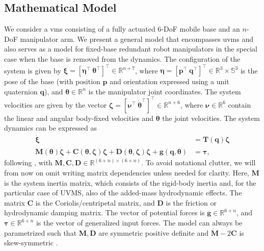 \documentclass[../main.tex]{subfiles}
\begin{document}
\subsection{Mathematical Model}
We consider a \gls{vms} consisting of a fully actuated $6$-DoF mobile base and an $n$-DoF manipulator arm. We present a general model that encompasses \gls{uvms} and also serves as a model for fixed-base redundant robot manipulators in the special case when the base is removed from the dynamics. The configuration of the system is given by $\bm{\xi} = [ \bm{\eta}^{\top} \  \bm{\theta}^{\top}]^{\top} \in \mathbb{R}^{n+7}$, where $\bm{\eta} = [ \bm{p}^{\top} \  \bm{q}^{\top}]^{\top} \in \mathbb{R}^3 \times \mathbb{S}^3$ is the pose of the base (with position $\bm{p}$ and orientation expressed using a unit quaternion $\bm{q}$), and $\bm{\theta} \in \mathbb{R}^n$ is the manipulator joint coordinates. The system velocities are given by the vector $\bm{\zeta} = [ \bm{\nu}^{\top} \  \dot{\bm{\theta}}^{\top}]^{\top} \in \mathbb{R}^{n+6}$, where $\bm{\nu} \in \mathbb{R}^6$ contain the linear and angular body-fixed velocities and $\dot{\bm{\theta}}$ the joint velocities. The system dynamics can be expressed as
\begin{subequations}
\label{eq:UVMS_dynamics}
\begin{align}
    \dot{\bm{\xi}} &= \bm{T}( \bm{q} ) \bm{\zeta} \\
    \bm{M}(\bm{\theta}) \dot{\bm{\zeta}}
    + \bm{C}(\bm{\theta}, \bm{\zeta}) \bm{\zeta}
    + \bm{D}(\bm{\theta}, \bm{\zeta}) \bm{\zeta}
    + \bm{g}(\bm{q},\bm{\theta}) &= \bm{\tau},
\end{align}
\end{subequations}
following \cite{Antonelli2018}, with $\bm{M}, \bm{C}, \bm{D} \in \mathbb{R}^{(6+n) \times (6+n)}$. To avoid notational clutter, we will from now on omit writing matrix dependencies unless needed for clarity. Here, $\bm{M}$ is the system inertia matrix, which consists of the rigid-body inertia and, for the particular case of UVMS, also of the added-mass hydrodynamic effects. The matrix $\bm{C}$ is the Coriolis/centripetal matrix, and $\bm{D}$ is the friction or hydrodynamic damping matrix. The vector of potential forces is $\bm{g} \in \mathbb{R}^{6+n}$, and $\bm{\tau} \in \mathbb{R}^{6+n}$ is the vector of generalized input forces. The model can always be parametrized such that $\bm{M}, \bm{D}$ are symmetric positive definite and $\dot{\bm{M}} - 2\bm{C}$ is skew-symmetric \cite{Antonelli2018}.
\end{document}
